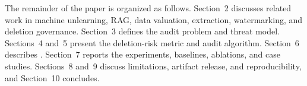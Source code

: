 The remainder of the paper is organized as follows. Section~2 discusses related work in machine unlearning, RAG, data valuation, extraction, watermarking, and deletion governance. Section~3 defines the audit problem and threat model. Sections~4 and~5 present the deletion-risk metric and audit algorithm. Section~6 describes \bench{}. Section~7 reports the experiments, baselines, ablations, and case studies. Sections~8 and~9 discuss limitations, artifact release, and reproducibility, and Section~10 concludes.
